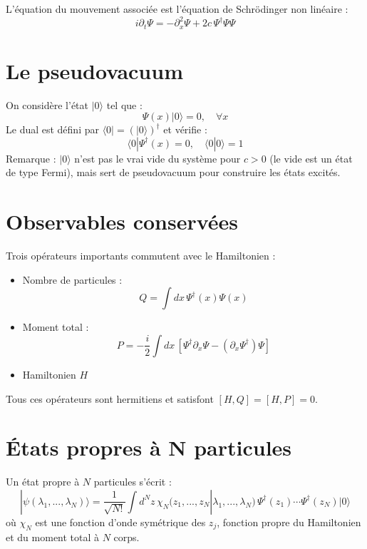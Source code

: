 L’équation du mouvement associée est l’équation de Schrödinger non linéaire :
\begin{equation}
i \partial_t \Psi = -\partial_x^2 \Psi + 2c\, \Psi^\dagger \Psi \Psi
\end{equation}

\section{Le pseudovacuum}
On considère l’état $|0\rangle$ tel que :
\begin{equation}
\Psi(x) |0\rangle = 0, \quad \forall x
\end{equation}
Le dual est défini par $\langle 0| = (|0\rangle)^\dagger$ et vérifie :
\begin{equation}
\langle 0| \Psi^\dagger(x) = 0, \quad \langle 0|0\rangle = 1
\end{equation}
Remarque : $|0\rangle$ n’est pas le vrai vide du système pour $c > 0$ (le vide est un état de type Fermi), mais sert de pseudovacuum pour construire les états excités.

\section{Observables conservées}
Trois opérateurs importants commutent avec le Hamiltonien :
\begin{itemize}
  \item Nombre de particules :
  \[
  Q = \int dx\, \Psi^\dagger(x) \Psi(x)
  \]
  \item Moment total :
  \[
  P = -\frac{i}{2} \int dx\, \left[ \Psi^\dagger \partial_x \Psi - (\partial_x \Psi^\dagger) \Psi \right]
  \]
  \item Hamiltonien $H$
\end{itemize}
Tous ces opérateurs sont hermitiens et satisfont $[H, Q] = [H, P] = 0$.

\section{États propres à N particules}
Un état propre à $N$ particules s’écrit :
\begin{equation}
|\psi(\lambda_1, ..., \lambda_N)\rangle = \frac{1}{\sqrt{N!}} \int d^N z\, \chi_N(z_1,...,z_N|\lambda_1,...,\lambda_N)\, \Psi^\dagger(z_1)\cdots \Psi^\dagger(z_N) |0\rangle
\end{equation}
où $\chi_N$ est une fonction d’onde symétrique des $z_j$, fonction propre du Hamiltonien et du moment total à $N$ corps.


